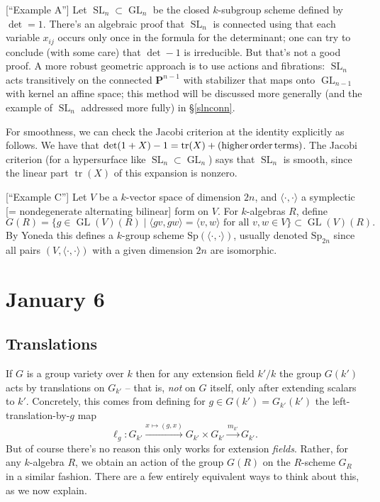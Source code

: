 \documentclass[10pt]{article}
\newcommand{\PP}{\mathbf{P}}
\newcommand{\GL}{\operatorname{GL}}
\newcommand{\SL}{\operatorname{SL}}
\newcommand{\tr}{\operatorname{tr}}
\renewcommand{\(}{\left(}
\renewcommand{\)}{\right)}
\newcommand{\Sp}{\mathrm{Sp}}
\numberwithin{thm}{subsection}
\begin{document}
\begin{ex}\label{exampleA}[``Example A'']
Let $\SL_n\subset \GL_n$ be the closed $k$-subgroup scheme
defined by $\det = 1$. There's an algebraic proof that  $\SL_n$ is connected using 
that each variable $x_{ij}$ occurs only once in the formula for the determinant; one can 
try to conclude (with some care) that $\det - 1$ is irreducible.
But that's not a good proof.
A more robust geometric approach is to use actions and fibrations:
$\SL_n$ acts transitively on the connected $\PP^{n-1}$
with stabilizer that maps onto $\GL_{n-1}$ with kernel an affine space;
this method will be discussed more generally (and the example of $\SL_n$ addressed
more fully) in \S\ref{slnconn}.

For smoothness, we can check the Jacobi criterion at the identity explicitly as follows. 
We have that $\det(1+X)-1=\tr(X)+({\rm{higher\, order\, terms}})$.
The Jacobi criterion (for a hypersurface like $\SL_n\subset \GL_n$)
says that $\SL_n$ is smooth, since the linear part $\tr(X)$
of this expansion is nonzero.
\end{ex}
\begin{ex}\label{exampleC}[``Example C'']
Let $V$ be a $k$-vector space of dimension $2n$, and $\langle \cdot , \cdot \rangle$
a symplectic [= nondegenerate alternating bilinear] form on $V$.
For $k$-algebras $R$, define 
$$G(R)=\{g\in \GL(V)(R)\mid \langle gv,gw\rangle=\langle v,w\rangle \mbox{ for all } v,w\in V\}\subset \GL(V)(R).$$
By Yoneda this defines a $k$-group scheme $\Sp(\langle \cdot , \cdot \rangle)$, usually denoted $\Sp_{2n}$
since all pairs $(V, \langle \cdot, \cdot \rangle)$ with a given dimension $2n$ are isomorphic.
\end{ex} 

\section{January 6}
\subsection{Translations}
If $G$ is a group variety over $k$ then for any extension field $k'/k$
the group $G(k')$ acts by translations on $G_{k'}$ -- that is, \textit{not} on $G$ itself, only after extending scalars to $k'$. Concretely, this comes from defining for $g\in G(k')=G_{k'}(k')$ the left-translation-by-$g$ map
\[\ell_g:G_{k'}\stackrel{x\mapsto(g,x)}{\to} G_{k'}\times G_{k'}\stackrel{m_{k'}}{\to} G_{k'}.\]
But of course there's no reason this only works for extension \textit{fields}.
Rather, for any $k$-algebra $R$, we obtain an action of the group $G(R)$ on 
the $R$-scheme $G_R$ in a similar fashion. There are a few entirely equivalent ways to think about this,
as we now explain.
\end{document}

